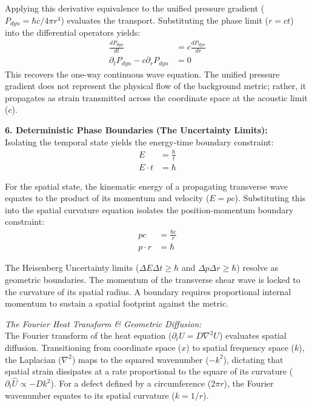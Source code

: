 Applying this derivative equivalence to the unified pressure gradient ($P_{dyn} = \hbar c / 4\pi r^4$) evaluates the transport. Substituting the phase limit ($r = ct$) into the differential operators yields:
\begin{align}
    \frac{d P_{dyn}}{dt} &= c \frac{d P_{dyn}}{dr} \nonumber \\
    \partial_t P_{dyn} - c \partial_r P_{dyn} &= 0
\end{align}
This recovers the one-way continuous wave equation. The unified pressure gradient does not represent the physical flow of the background metric; rather, it propagates as strain transmitted across the coordinate space at the acoustic limit ($c$).

\vspace{0.2 cm}

\textbf{6. Deterministic Phase Boundaries (The Uncertainty Limits):} \\
Isolating the temporal state yields the energy-time boundary constraint:
\begin{align}
    E &= \frac{\hbar}{t} \nonumber \\
    E \cdot t &= \hbar
\end{align}

For the spatial state, the kinematic energy of a propagating transverse wave equates to the product of its momentum and velocity ($E = pc$). Substituting this into the spatial curvature equation isolates the position-momentum boundary constraint:
\begin{align}
    p c &= \frac{\hbar c}{r} \nonumber \\
    p \cdot r &= \hbar
\end{align}

The Heisenberg Uncertainty limits ($\Delta E \Delta t \ge \hbar$ and $\Delta p \Delta r \ge \hbar$) resolve as geometric boundaries. The momentum of the transverse shear wave is locked to the curvature of its spatial radius. A boundary requires proportional internal momentum to sustain a spatial footprint against the metric.

\vspace{0.2 cm}
\textit{The Fourier Heat Transform \& Geometric Diffusion:}\\
The Fourier transform of the heat equation ($\partial_t U = D \nabla^2 U$) evaluates spatial diffusion. Transitioning from coordinate space ($x$) to spatial frequency space ($k$), the Laplacian ($\nabla^2$) maps to the squared wavenumber ($-k^2$), dictating that spatial strain dissipates at a rate proportional to the square of its curvature ($\partial_t \hat{U} \propto -D k^2$). For a defect defined by a circumference ($2\pi r$), the Fourier wavenumber equates to its spatial curvature ($k = 1/r$). 


